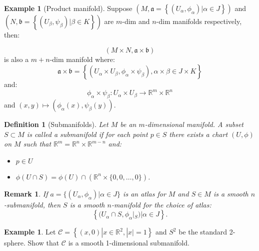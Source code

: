 \documentclass{article}
\newtheorem{definition}[theorem]{Definition}
\newtheorem{remark}[theorem]{Remark}
\theoremstyle{definition}
\newtheorem{example}[theorem]{Example}
\numberwithin{theorem}{section}
\numberwithin{equation}{section}
\begin{document}
\begin{example}[Product manifold]
	Suppose $(M, \mathfrak{a} = \left\{ (U_{\alpha}, \phi_\alpha) | \alpha \in J \right\} )$ and $(N, \mathfrak{b} = \left\{ (U_{\beta}, \psi_\beta) | \beta \in K \right\} )$ are $m$-dim and $n$-dim manifolds respectively, then:
	
	\begin{equation}
		\left(M \times N, \mathfrak{a} \times \mathfrak{b} \right)
	\end{equation}
	is also a $m + n$-dim manifold where:
	\begin{equation}
		\mathfrak{a} \times \mathfrak{b} = \left\{ (U_\alpha \times U_\beta, \phi_\alpha \times \psi_\beta), \alpha \times \beta \in J \times K \right\}
	\end{equation}
	and: 
	\begin{equation}
		\phi_\alpha \times \psi_\beta : U_\alpha \times U_\beta \rightarrow \mathbb{R}^m \times \mathbb{R}^n
	\end{equation}
	and $(x, y) \mapsto (\phi_\alpha(x), \psi_\beta(y))$. 

\end{example}

\begin{definition}[Submanifolds]
	Let $M$ be an $m$-dimensional manifold. A subset $S \subset M$ is called a submanifold if for each point $p \in S$ there exists a chart $(U, \phi)$ on $M$ such that $\mathbb{R}^m = \mathbb{R}^n \times \mathbb{R}^{m - n}$ and:
	\begin{itemize}
		\item $p \in U$
		\item $\phi(U \cap S) = \phi(U) \cap (\mathbb{R}^n \times \{0, 0, \ldots, 0\})$.
	\end{itemize}
\end{definition}

\begin{remark}
	If $a = \{(U_\alpha, \phi_\alpha) | \alpha \in J\}$ is an atlas for $M$ and $S \in M$ is a smooth $n$-submanifold, then $S$ is a smooth $n$-manifold for the choice of atlas: 
	\begin{equation}
		\left\{ (U_{\alpha} \cap S, \phi_\alpha|_S) | \alpha \in J \right\}.
	\end{equation}
\end{remark}

\begin{example}
	Let $\mathcal{C} = \left\{(x, 0) | x \in \mathbb{R}^2 , |x| = 1\right\}$ and $S^2$ be the standard 2-sphere. Show that $\mathcal{C}$ is a smooth 1-dimensional submanifold. 
\end{example}
\end{document}
